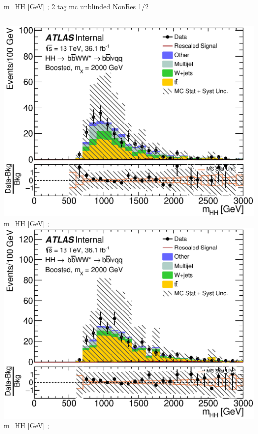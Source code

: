 \begin{frame}{m\_{HH} [GeV]  ; 2 tag mc unblinded NonRes 1/2}
\begin{columns}[c]
    \centering\includegraphics[width=\textwidth]{C_2tag_mbbcrLow_lepton_presel_met50_hhMassRebin1}\\
    m\_{HH} [GeV]  ; 
    \centering\includegraphics[width=\textwidth]{C_2tag_mbbcr_muon_presel_met50_hhMassRebin1}\\
    m\_{HH} [GeV]  ; 

\end{columns}
\end{frame}
